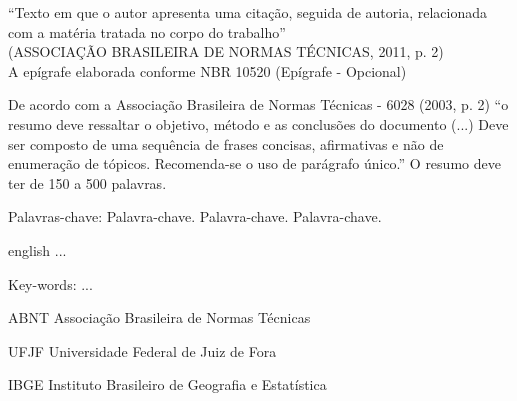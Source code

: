 \documentclass[
        12pt,
        openany, %
        oneside, %
        a4paper,			
        english,			
        brazil			        %
        ]{abntbibufjf}
\begin{document}
\begin{epigrafe}
    \vspace*{\fill}
	\begin{flushright}
		``Texto em que o autor apresenta uma cita\c{c}\~ao, seguida de autoria, relacionada com a                       
  mat\'eria tratada no corpo do trabalho'' \\
(ASSOCIA\c{C}\~AO BRASILEIRA DE NORMAS T\'ECNICAS, 2011, p. 2) \\
  A ep\'igrafe elaborada conforme NBR 10520 (Ep\'igrafe - Opcional)
	\end{flushright}
\end{epigrafe}



\setlength{\absparsep}{18pt} 
\begin{resumo}
De acordo com a Associa\c{c}\~ao Brasileira de Normas T\'ecnicas - 6028 (2003, p. 2) ``o resumo deve ressaltar 
o objetivo, m\'etodo e as conclus\~oes do documento (...) Deve ser composto de uma sequ\^encia de frases 
concisas, afirmativas e n\~ao de enumera\c{c}\~ao de t\'opicos. Recomenda-se o uso de par\'agrafo \'unico.''
O resumo deve ter de 150 a 500 palavras.

Palavras-chave: Palavra-chave. Palavra-chave. Palavra-chave. %

\end{resumo}
 
 
\begin{resumo}[ABSTRACT]
 \begin{otherlanguage*}{english}
   ...

Key-words: ...
 \end{otherlanguage*}
\end{resumo}


\listoffigures*
\cleardoublepage



\begin{siglas} %
  \item[ABNT] Associa\c{c}\~ao Brasileira de Normas T\'ecnicas
  \item[UFJF] Universidade Federal de Juiz de Fora
  \item[IBGE] Instituto Brasileiro de Geografia e Estat\'istica
\end{siglas}
\end{document}

